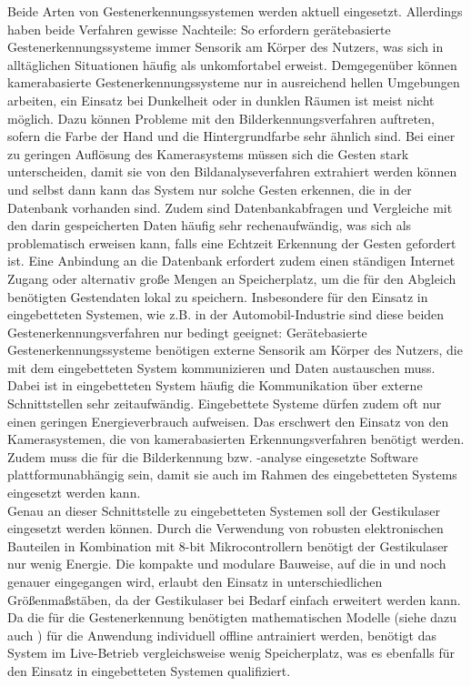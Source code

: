 Beide Arten von Gestenerkennungssystemen werden aktuell eingesetzt. Allerdings haben beide Verfahren gewisse Nachteile: So erfordern gerätebasierte Gestenerkennungssysteme immer Sensorik am Körper des Nutzers, was sich in alltäglichen Situationen häufig als unkomfortabel erweist. Demgegenüber können kamerabasierte Gestenerkennungssysteme nur in ausreichend hellen Umgebungen arbeiten, ein Einsatz bei Dunkelheit oder in dunklen Räumen ist meist nicht möglich. Dazu können Probleme mit den Bilderkennungsverfahren auftreten, sofern die Farbe der Hand und die Hintergrundfarbe sehr ähnlich sind. Bei einer zu geringen Auflösung des Kamerasystems müssen sich die Gesten stark unterscheiden, damit sie von den Bildanalyseverfahren extrahiert werden können und selbst dann kann das System nur solche Gesten erkennen, die in der Datenbank vorhanden sind. Zudem sind Datenbankabfragen und Vergleiche mit den darin gespeicherten Daten häufig sehr rechenaufwändig, was sich als problematisch erweisen kann, falls eine Echtzeit Erkennung der Gesten gefordert ist. Eine Anbindung an die Datenbank erfordert zudem einen ständigen Internet Zugang oder alternativ große Mengen an Speicherplatz, um die für den Abgleich benötigten Gestendaten lokal zu speichern. Insbesondere für den Einsatz in eingebetteten Systemen, wie z.B. in der Automobil-Industrie sind diese beiden Gestenerkennungsverfahren nur bedingt geeignet: Gerätebasierte Gestenerkennungssysteme benötigen externe Sensorik am Körper des Nutzers, die mit dem eingebetteten System kommunizieren und Daten austauschen muss. Dabei ist in eingebetteten System häufig die Kommunikation über externe Schnittstellen sehr zeitaufwändig. Eingebettete Systeme dürfen zudem oft nur einen geringen Energieverbrauch aufweisen. Das erschwert den Einsatz von den Kamerasystemen, die von kamerabasierten Erkennungsverfahren benötigt werden. Zudem muss die für die Bilderkennung bzw. -analyse eingesetzte Software plattformunabhängig sein, damit sie auch im Rahmen des eingebetteten Systems eingesetzt werden kann. \\
Genau an dieser Schnittstelle zu eingebetteten Systemen soll der Gestikulaser eingesetzt werden können. Durch die Verwendung von robusten elektronischen Bauteilen in Kombination mit 8-bit Mikrocontrollern benötigt der Gestikulaser nur wenig Energie. Die kompakte und modulare Bauweise, auf die in  und  noch genauer eingegangen wird, erlaubt den Einsatz in unterschiedlichen Größenmaßstäben, da der Gestikulaser bei Bedarf einfach erweitert werden kann. Da die für die Gestenerkennung benötigten mathematischen Modelle (siehe dazu auch ) für die Anwendung individuell offline antrainiert werden, benötigt das System im Live-Betrieb vergleichsweise wenig Speicherplatz, was es ebenfalls für den Einsatz in eingebetteten Systemen qualifiziert.